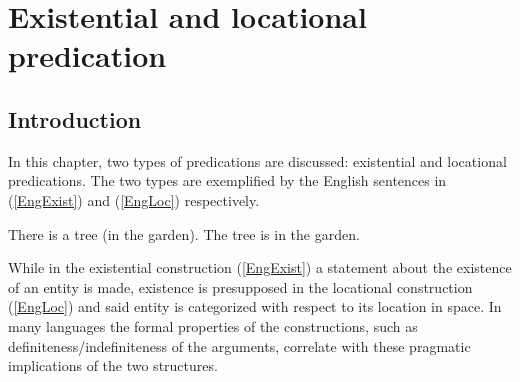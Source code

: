 \chapter{Existential and locational predication}\label{existpred}



\section{Introduction}

In this chapter, two types of predications are discussed: existential and locational predications.
The two types are exemplified by the English sentences in (\ref{EngExist}) and (\ref{EngLoc}) respectively.

\eal
\ex\label{EngExist}
There is a tree (in the garden).
\ex\label{EngLoc}
The tree is in the garden.
\zl

\noindent
While in the existential construction (\ref{EngExist}) a statement about the existence of an entity is made, existence is presupposed in the locational construction (\ref{EngLoc}) and said entity is categorized with respect to its location in space.
In many languages the formal properties of the constructions, such as definiteness/indefiniteness of the arguments, correlate with these pragmatic implications of the two structures.

